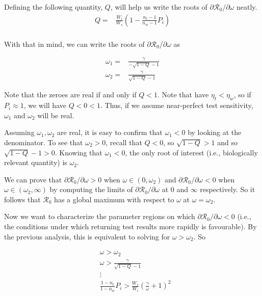 \documentclass{article}
\newcommand{\Rnum}{\mathcal{R}_0}
\begin{document}
Defining the following quantity, $Q$, will help us write the roots of $\partial{\Rnum}/\partial{\omega}$ neatly. 
\begin{align}\label{eq:defQ}
    Q =& \frac{W_i}{W_s}\left(1-\frac{n_{t}-1}{n_{w}-1}P_{i}\right) \\
\end{align}

With that in mind, we can write the roots of $\partial{\Rnum}/\partial{\omega}$ as

\begin{align}
    \omega_1 =& \frac{\gamma}{-\sqrt{1-Q}-1} \\
    \omega_2 =& \frac{\gamma}{\sqrt{1-Q}-1}
\end{align}

Note that the zeroes are real if and only if $Q < 1$. Note that have $\eta_t < \eta_w$, so if $P_i \approx 1$, we will have $Q < 0 < 1$. Thus, if we assume near-perfect test sensitivity, $\omega_1$ and $\omega_2$ will be real. 

Assuming $\omega_1, \omega_2$ are real, it is easy to confirm that $\omega_1 < 0$ by looking at the denominator. To see that $\omega_2 > 0$, recall that $Q < 0$, so $\sqrt{1-Q} > 1$ and so $\sqrt{1-Q} -1 > 0$. Knowing that $\omega_1 < 0$, the only root of interest (i.e., biologically relevant quantity) is $\omega_2$. 

We can prove that $\partial{\Rnum}/\partial{\omega} > 0$ when $\omega \in (0,\omega_2)$ and $\partial{\Rnum}/\partial{\omega} < 0$ when $\omega \in (\omega_2,\infty)$ by computing the limits of $\partial{\Rnum}/\partial{\omega}$ at $0$ and $\infty$ respectively. So it follows that $\Rnum$ has a global maximum with respect to $\omega$ at $\omega = \omega_2$.

Now we want to characterize the parameter regions on which $\partial{\Rnum}/\partial{\omega} < 0$ (i.e., the conditions under which returning test results more rapidly is favourable). By the previous analysis, this is equivalent to solving for $\omega > \omega_2$. So

\begin{align}\label{eq:necsuf}
    &\omega > \omega_2 \nonumber \\
    &\omega > \frac{\gamma}{\sqrt{1-Q}-1} \nonumber \\
    &\vdots \nonumber \\
    &\frac{1-n_{t}}{1-n_{w}}P_{i}>\frac{W_{s}}{W_{i}}\left(\frac{\gamma}{\omega}+1\right)^{2}
\end{align}
\end{document}
